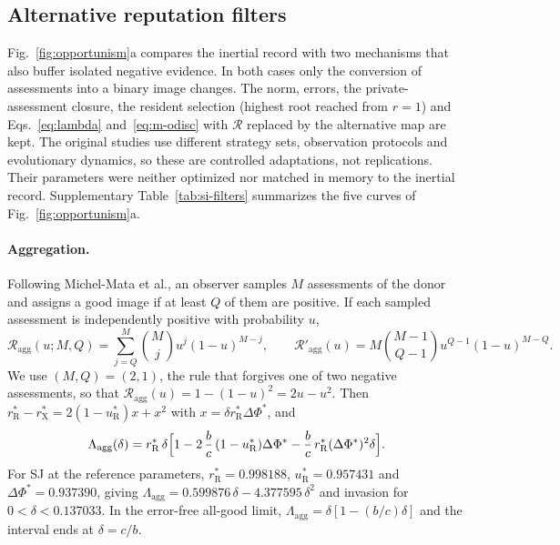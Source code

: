 \documentclass[fleqn,10pt]{wlscirep}
\newcommand{\Rmap}{\mathscr{R}}            %
\newcommand{\rR}{r_{\mathrm{R}}^{*}}
\newcommand{\uR}{u_{\mathrm{R}}^{*}}
\newcommand{\rX}{r_{\mathrm{X}}^{*}}
\newcommand{\dPhi}{\Delta\Phi^{*}}
\theoremstyle{plain}
\begin{document}
\subsection{Alternative reputation filters}
\label{si:filters}

Fig.~\ref{fig:opportunism}a compares the inertial record with two mechanisms that also buffer isolated negative evidence. In both cases only the conversion of assessments into a binary image changes. The norm, errors, the private-assessment closure, the resident selection (highest root reached from $r=1$) and Eqs.~\eqref{eq:lambda} and~\eqref{eq:m-odisc} with $\Rmap$ replaced by the alternative map are kept. The original studies use different strategy sets, observation protocols and evolutionary dynamics, so these are controlled adaptations, not replications. Their parameters were neither optimized nor matched in memory to the inertial record. Supplementary Table~\ref{tab:si-filters} summarizes the five curves of Fig.~\ref{fig:opportunism}a.

\paragraph{Aggregation.} Following Michel-Mata et al., an observer samples $M$ assessments of the donor and assigns a good image if at least $Q$ of them are positive. If each sampled assessment is independently positive with probability $u$,
\begin{equation}
\Rmap_{\mathrm{agg}}(u;M,Q)=\sum_{j=Q}^{M}\binom{M}{j}u^j(1-u)^{M-j},\qquad
\Rmap'_{\mathrm{agg}}(u)=M\binom{M-1}{Q-1}u^{Q-1}(1-u)^{M-Q}.
\label{eq:s-aggregation}
\end{equation}
We use $(M,Q)=(2,1)$, the rule that forgives one of two negative assessments, so that $\Rmap_{\mathrm{agg}}(u)=1-(1-u)^2=2u-u^2$. Then $\rR-\rX=2(1-\uR)x+x^2$ with $x=\delta\rR\dPhi$, and
\begin{equation}
\Lambda_{\mathrm{agg}}(\delta)=\rR\,\delta\Bigl[1-2\,\frac{b}{c}\,(1-\uR)\dPhi-\frac{b}{c}\,\rR(\dPhi)^2\delta\Bigr].
\label{eq:s-aggregation-lambda}
\end{equation}
For SJ at the reference parameters, $\rR=0.998188$, $\uR=0.957431$ and $\dPhi=0.937390$, giving $\Lambda_{\mathrm{agg}}=0.599876\,\delta-4.377595\,\delta^2$ and invasion for $0<\delta<0.137033$. In the error-free all-good limit, $\Lambda_{\mathrm{agg}}=\delta[1-(b/c)\delta]$ and the interval ends at $\delta=c/b$.
\end{document}

